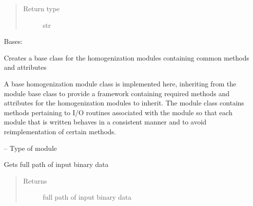\documentclass[letterpaper,10pt,english]{sphinxmanual}
\begin{document}
\begin{fulllineitems}
\begin{fulllineitems}
\begin{quote}
\begin{description}
\item[{Return type}] \leavevmode
str

\end{description}\end{quote}

\end{fulllineitems}


\end{fulllineitems}


\begin{fulllineitems}
\label{\detokenize{MouseReferenceManual:Modules.Base.HomogenizationModuleBaseClass}}
Bases: {\hyperref[\detokenize{MouseReferenceManual:Modules.Base.ModuleBaseClass}]{}}

Creates a base class for the homogenization modules containing common methods and attributes

A base homogenization module class is implemented here, inheriting from the module base class to provide a framework containing required methods and attributes for the homogenization modules to inherit. The module class contains methods pertaining to I/O routines associated with the module so that each module that is written behaves in a consistent manner and to avoid reimplementation of certain methods.

\begin{fulllineitems}
\label{\detokenize{MouseReferenceManual:Modules.Base.HomogenizationModuleBaseClass.type}}
 -- Type of module

\end{fulllineitems}


\begin{fulllineitems}
\label{\detokenize{MouseReferenceManual:Modules.Base.HomogenizationModuleBaseClass.inputFileName}}
Gets full path of input binary data
\begin{quote}\begin{description}
\item[{Returns}] \leavevmode
full path of input binary data


\end{description}
\end{quote}
\end{fulllineitems}
\end{fulllineitems}
\end{document}
